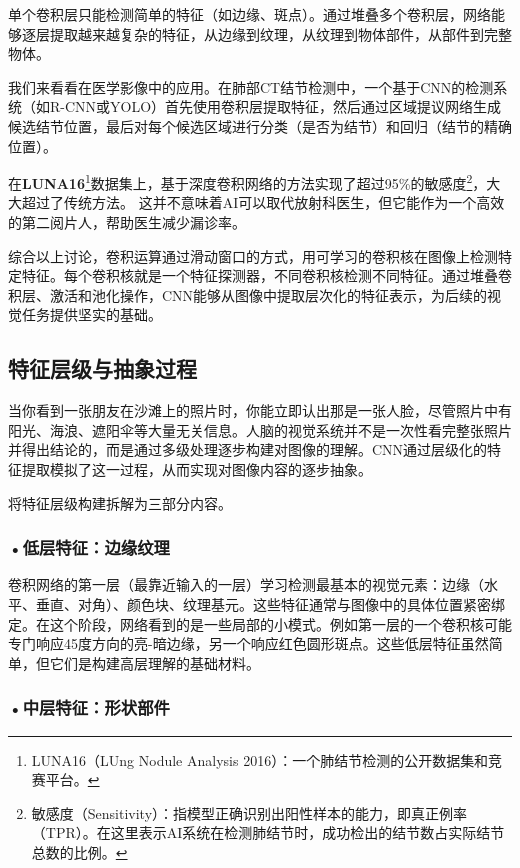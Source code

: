 单个卷积层只能检测简单的特征（如边缘、斑点）。通过堆叠多个卷积层，网络能够逐层提取越来越复杂的特征，从边缘到纹理，从纹理到物体部件，从部件到完整物体。

我们来看看在医学影像中的应用。在肺部CT结节检测中，一个基于CNN的检测系统（如R-CNN或YOLO）首先使用卷积层提取特征，然后通过区域提议网络生成候选结节位置，最后对每个候选区域进行分类（是否为结节）和回归（结节的精确位置）。

在\textbf{LUNA16}\footnote{LUNA16（LUng Nodule Analysis 2016）：一个肺结节检测的公开数据集和竞赛平台。}数据集上，基于深度卷积网络的方法实现了超过95\%的敏感度\footnote{敏感度（Sensitivity）：指模型正确识别出阳性样本的能力，即真正例率（TPR）。在这里表示AI系统在检测肺结节时，成功检出的结节数占实际结节总数的比例。}，大大超过了传统方法。
这并不意味着AI可以取代放射科医生，但它能作为一个高效的第二阅片人，帮助医生减少漏诊率。

综合以上讨论，卷积运算通过滑动窗口的方式，用可学习的卷积核在图像上检测特定特征。每个卷积核就是一个特征探测器，不同卷积核检测不同特征。通过堆叠卷积层、激活和池化操作，CNN能够从图像中提取层次化的特征表示，为后续的视觉任务提供坚实的基础。







\subsection{特征层级与抽象过程}
当你看到一张朋友在沙滩上的照片时，你能立即认出那是一张人脸，尽管照片中有阳光、海浪、遮阳伞等大量无关信息。人脑的视觉系统并不是一次性看完整张照片并得出结论的，而是通过多级处理逐步构建对图像的理解。CNN通过层级化的特征提取模拟了这一过程，从而实现对图像内容的逐步抽象。

将特征层级构建拆解为三部分内容。

\subsubsection*{\textbf{•低层特征：边缘纹理}}

卷积网络的第一层（最靠近输入的一层）学习检测最基本的视觉元素：边缘（水平、垂直、对角）、颜色块、纹理基元。这些特征通常与图像中的具体位置紧密绑定。在这个阶段，网络看到的是一些局部的小模式。例如第一层的一个卷积核可能专门响应45度方向的亮-暗边缘，另一个响应红色圆形斑点。这些低层特征虽然简单，但它们是构建高层理解的基础材料。

\subsubsection*{\textbf{•中层特征：形状部件}}

